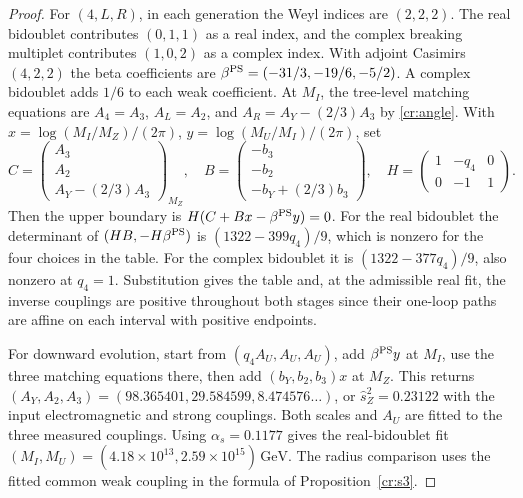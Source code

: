 \documentclass[aps,pra,onecolumn,superscriptaddress,nofootinbib,10pt]{revtex4-2}
\theoremstyle{definition}
\theoremstyle{remark}
\begin{document}
\begin{proof}
For $(4,L,R)$, in each generation the Weyl indices are $(2,2,2)$.
The real bidoublet contributes $(0,1,1)$ as a real index,
and the complex breaking multiplet contributes $(1,0,2)$ as a
complex index. With adjoint Casimirs $(4,2,2)$ the beta
coefficients are $\beta^{\rm PS}=(-31/3,-19/6,-5/2)$.
A complex bidoublet adds $1/6$ to each weak coefficient.
At $M_I$, the tree-level matching equations are
$A_4=A_3$, $A_L=A_2$, and $A_R=A_Y-(2/3)A_3$ by
\eqref{cr:angle}. With $x=\log(M_I/M_Z)/(2\pi)$,
$y=\log(M_U/M_I)/(2\pi)$, set
\[
 C=\begin{pmatrix} A_3\\ A_2\\ A_Y-(2/3)A_3\end{pmatrix}_{M_Z},
 \quad
 B=\begin{pmatrix}-b_3\\-b_2\\-b_Y+(2/3)b_3\end{pmatrix},
 \quad
 H=\begin{pmatrix}1&-q_4&0\\0&-1&1\end{pmatrix}.
\]
Then the upper boundary is $H(C+Bx-\beta^{\rm PS}y)=0$.
For the real bidoublet the determinant of
$(HB,-H\beta^{\rm PS})$ is $(1322-399q_4)/9$,
which is nonzero for the four choices in the table.
For the complex bidoublet it is $(1322-377q_4)/9$,
also nonzero at $q_4=1$. Substitution gives the table
and, at the admissible real fit, the inverse couplings
are positive throughout both stages since their one-loop
paths are affine on each interval with positive endpoints.

For downward evolution, start from $(q_4 A_U,A_U,A_U)$,
add $\beta^{\rm PS} y$ at $M_I$, use the three matching
equations there, then add $(b_Y,b_2,b_3)x$ at $M_Z$.
This returns $(A_Y,A_2,A_3)=(98.365401,29.584599,8.474576\ldots)$,
or $\hat s_Z^2=0.23122$ with the input electromagnetic and strong
couplings. Both scales and $A_U$ are fitted to the three measured
couplings. Using $\alpha_s=0.1177$ gives the real-bidoublet fit
$(M_I,M_U)=(4.18\times10^{13},2.59\times10^{15})\,\mathrm{GeV}$.
The radius comparison uses the fitted common weak coupling in
the formula of Proposition~\ref{cr:s3}.
\end{proof}
\end{document}
